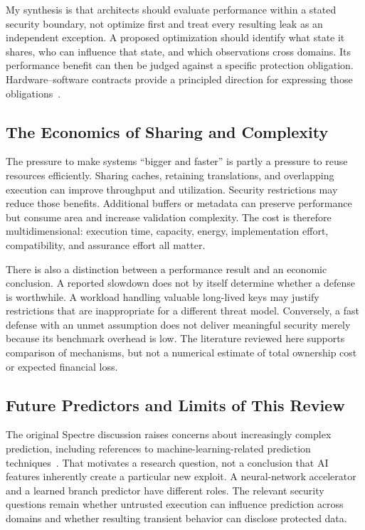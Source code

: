 \documentclass[man,12pt,apacite,nofontenc,nolmodern,floatsintext]{apa6}
\begin{document}
My synthesis is that architects should evaluate performance within a stated security boundary, not optimize first and treat every resulting leak as an independent exception. A proposed optimization should identify what state it shares, who can influence that state, and which observations cross domains. Its performance benefit can then be judged against a specific protection obligation. Hardware--software contracts provide a principled direction for expressing those obligations~\cite{contracts2021}.

\subsection{The Economics of Sharing and Complexity}
The pressure to make systems ``bigger and faster'' is partly a pressure to reuse resources efficiently. Sharing caches, retaining translations, and overlapping execution can improve throughput and utilization. Security restrictions may reduce those benefits. Additional buffers or metadata can preserve performance but consume area and increase validation complexity. The cost is therefore multidimensional: execution time, capacity, energy, implementation effort, compatibility, and assurance effort all matter.

There is also a distinction between a performance result and an economic conclusion. A reported slowdown does not by itself determine whether a defense is worthwhile. A workload handling valuable long-lived keys may justify restrictions that are inappropriate for a different threat model. Conversely, a fast defense with an unmet assumption does not deliver meaningful security merely because its benchmark overhead is low. The literature reviewed here supports comparison of mechanisms, but not a numerical estimate of total ownership cost or expected financial loss.

\subsection{Future Predictors and Limits of This Review}
The original Spectre discussion raises concerns about increasingly complex prediction, including references to machine-learning-related prediction techniques~\cite{spectre2019}. That motivates a research question, not a conclusion that AI features inherently create a particular new exploit. A neural-network accelerator and a learned branch predictor have different roles. The relevant security questions remain whether untrusted execution can influence prediction across domains and whether resulting transient behavior can disclose protected data.
\end{document}
